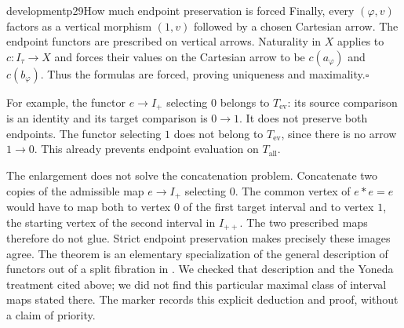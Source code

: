 \begin{dcomment}{development}{p29}{How much endpoint preservation is forced}
Finally, every $(\varphi,v)$ factors as a vertical morphism $(1,v)$ followed by a chosen Cartesian arrow. The endpoint functors are prescribed on vertical arrows. Naturality in $X$ applies to $c:I_\tau\to X$ and forces their values on the Cartesian arrow to be $c(a_\varphi)$ and $c(b_\varphi)$. Thus the formulas are forced, proving uniqueness and maximality.\hfill$\square$

For example, the functor $e\to I_+$ selecting $0$ belongs to $T_{\mathrm{ev}}$: its source comparison is an identity and its target comparison is $0\to1$. It does not preserve both endpoints. The functor selecting $1$ does not belong to $T_{\mathrm{ev}}$, since there is no arrow $1\to0$. This already prevents endpoint evaluation on $T_{\mathrm{all}}$.

The enlargement does not solve the concatenation problem. Concatenate two copies of the admissible map $e\to I_+$ selecting $0$. The common vertex of $e*e=e$ would have to map both to vertex $0$ of the first target interval and to vertex $1$, the starting vertex of the second interval in $I_{++}$. The two prescribed maps therefore do not glue. Strict endpoint preservation makes precisely these images agree. The theorem is an elementary specialization of the general description of functors out of a split fibration in \citet[Expos\'e~VI, Proposition~12.1]{GrothendieckSGA1}. We checked that description and the Yoneda treatment cited above; we did not find this particular maximal class of interval maps stated there. The marker records this explicit deduction and proof, without a claim of priority.
\end{dcomment}

